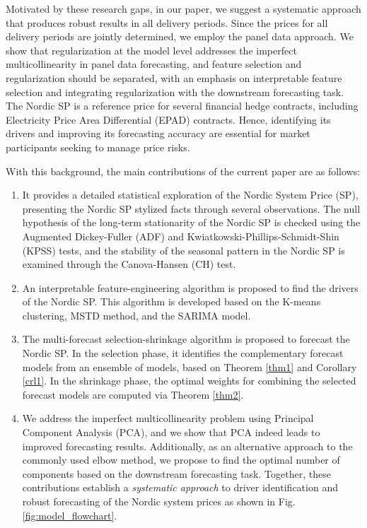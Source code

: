 \documentclass{article}
\begin{document}
Motivated by these research gaps, in our paper, we suggest a systematic approach that produces robust results in all delivery periods. Since the prices for all delivery periods are jointly determined, we employ the panel data approach. We show that regularization at the model level addresses the imperfect multicollinearity in panel data forecasting, and feature selection and regularization should be separated, with an emphasis on interpretable feature selection and integrating regularization with the downstream forecasting task. The Nordic SP is a reference price for several financial hedge contracts, including Electricity Price Area Differential (EPAD) contracts. Hence, identifying its drivers and improving its forecasting accuracy are essential for market participants seeking to manage price risks.   

With this background, the main contributions of the current paper are as follows:

\begin{enumerate}
    \item It provides a detailed statistical exploration of the Nordic System Price (SP), presenting the Nordic SP stylized facts through several observations. The null hypothesis of the long-term stationarity of the Nordic SP is checked using the Augmented Dickey-Fuller (ADF) and Kwiatkowski-Phillips-Schmidt-Shin (KPSS) tests, and the stability of the seasonal pattern in the Nordic SP is examined through the Canova-Hansen (CH) test.
    
    \item An interpretable feature-engineering algorithm is proposed to find the drivers of the Nordic SP. This algorithm is developed based on the K-means clustering, MSTD method, and the SARIMA model.
    
    \item The multi-forecast selection-shrinkage algorithm is proposed to forecast the Nordic SP. In the selection phase, it identifies the complementary forecast models from an ensemble of models, based on Theorem \ref{thm1} and Corollary \ref{crl1}. In the shrinkage phase, the optimal weights for combining the selected forecast models are computed via Theorem \ref{thm2}.
    
    \item We address the imperfect multicollinearity problem using Principal Component Analysis (PCA), and we show that PCA indeed leads to improved forecasting results. Additionally, as an alternative approach to the commonly used elbow method, we propose to find the optimal number of components based on the downstream forecasting task. Together, these contributions establish a \textit{systematic approach} to driver identification and robust forecasting of the Nordic system prices as shown in Fig. \ref{fig:model_flowchart}. 
\end{enumerate}
\end{document}
